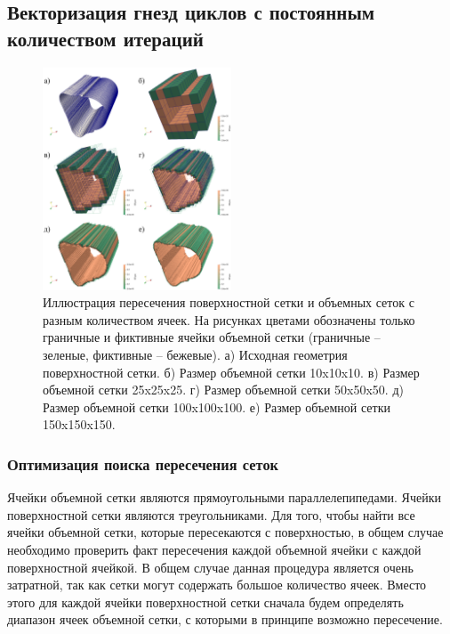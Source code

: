 \subsection{Векторизация гнезд циклов с постоянным количеством итераций}

\cite{Rybakov2019VecInt}

\begin{figure}[ht]
	\centering
		\includegraphics[width=0.5\textwidth]{./pics/text_4_mesh_intersect/contour.png}
	\caption{Иллюстрация пересечения поверхностной сетки и объемных сеток с разным количеством ячеек. На рисунках цветами обозначены только граничные и фиктивные ячейки объемной сетки (граничные -- зеленые, фиктивные -- бежевые). а) Исходная геометрия поверхностной сетки. б) Размер объемной сетки 10x10x10. в) Размер объемной сетки 25x25x25. г) Размер объемной сетки 50x50x50. д) Размер объемной сетки 100x100x100. е) Размер объемной сетки 150x150x150.}
	\label{fig:text_1_mesh_intersect_contour}
\end{figure}

\subsubsection{Оптимизация поиска пересечения сеток}

Ячейки объемной сетки являются прямоугольными параллелепипедами.
Ячейки поверхностной сетки являются треугольниками.
Для того, чтобы найти все ячейки объемной сетки, которые пересекаются с поверхностью, в общем случае необходимо проверить факт пересечения каждой объемной ячейки с каждой поверхностной ячейкой.
В общем случае данная процедура является очень затратной, так как сетки могут содержать большое количество ячеек.
Вместо этого для каждой ячейки поверхностной сетки сначала будем определять диапазон ячеек объемной сетки, с которыми в принципе возможно пересечение.

